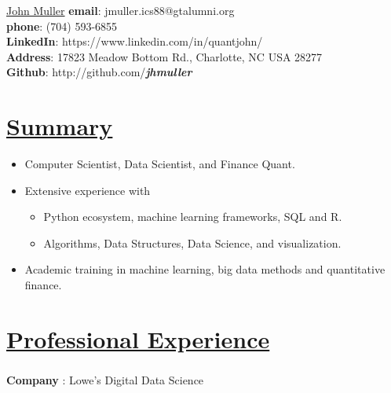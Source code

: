 \documentclass[
]{article}
\author{}
\date{}
\providecommand{\tightlist}{%
  \setlength{\itemsep}{0pt}\setlength{\parskip}{0pt}}
\begin{document}
{\LARGE \underline{John Muller}}
\vspace{0.1in}
\hfill\break
\textbf{email}: jmuller.ics88@gtalumni.org \\
\textbf{phone}:  (704) 593-6855\\
\textbf{LinkedIn}: https://www.linkedin.com/in/quantjohn/\\
\textbf{Address}: 17823 Meadow Bottom Rd., Charlotte, NC USA 28277\\
\textbf{Github}: http://github.com/\textbf{\emph{jhmuller}} \\

\hypertarget{summary}{%
\section{\texorpdfstring{\underline{\textbf{Summary}}}{Summary}}\label{summary}}

\begin{itemize}
\tightlist
\item
  Computer Scientist, Data Scientist, and Finance Quant.
\item
  Extensive experience with

  \begin{itemize}
  \tightlist
  \item
    Python ecosystem, machine learning frameworks, SQL and R.
  \item
    Algorithms, Data Structures, Data Science, and visualization.
  \end{itemize}
\item
  Academic training in machine learning, big data methods and
  quantitative finance.
\end{itemize}


\hypertarget{professional-experience}{\section{\texorpdfstring{\underline{\textbf{Professional
Experience}}}{Professional Experience}}\label{professional-experience}}

\hypertarget{lowes}
{\subsubsection{} \label{lowes}}

\begin{flushleft}
\textbf{Company} : Lowe's Digital Data Science 
\end{flushleft}
\end{document}
